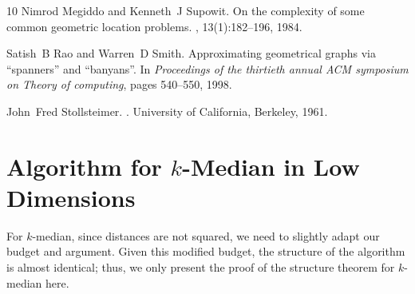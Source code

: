 \documentclass[11pt]{article}
\begin{document}
\begin{thebibliography}{10}
Nimrod Megiddo and Kenneth~J Supowit.
\newblock On the complexity of some common geometric location problems.
, 13(1):182--196, 1984.

Satish~B Rao and Warren~D Smith.
\newblock Approximating geometrical graphs via “spanners” and
  “banyans”.
\newblock In {\em Proceedings of the thirtieth annual ACM symposium on Theory
  of computing}, pages 540--550, 1998.

John~Fred Stollsteimer.
.
\newblock University of California, Berkeley, 1961.

\end{thebibliography}

\appendix






\section{Algorithm for $k$-Median in Low Dimensions}\label{app:k-med}

For $k$-median, since distances are not squared, we need to slightly adapt our budget and argument. Given this modified budget, the structure of the algorithm is almost identical; thus, we only present the proof of the structure theorem for $k$-median here.
\end{document}
